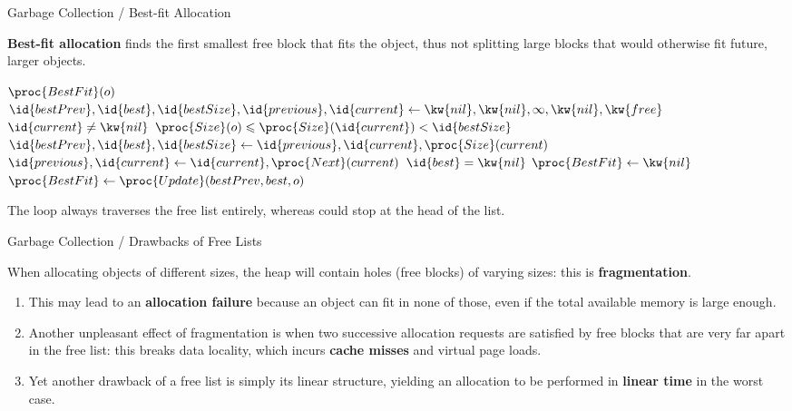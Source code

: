 \documentclass[compress,dvipdfmx]{beamer}
\begin{document}
%
\begin{frame}{Garbage Collection / Best-fit Allocation}

  \textbf{Best-fit allocation} finds the first smallest free block
  that fits the object, thus not splitting large blocks that would
  otherwise fit future, larger objects.
  \begin{codebox}
    \(\proc{BestFit}(o)\)\\
    \li \(\id{bestPrev}, \id{best}, \id{bestSize}, \id{previous}, \id{current}
          \gets \kw{nil}, \kw{nil}, \infty, \kw{nil}, \kw{free}\)
    \li \While \(\id{current} \neq \kw{nil}\) 
    \li \> \If \(\proc{Size}(o) \leqslant \proc{Size}(\id{current})
                < \id{bestSize}\)
    \li    \Then \(\id{bestPrev}, \id{best}, \id{bestSize} \gets
                   \id{previous}, \id{current}, \proc{Size}(current)\)
           \End
    \li \> \(\id{previous}, \id{current} \gets \id{current}, \proc{Next}(current)\)
    \li \If \(\id{best} = \kw{nil}\)
    \li \Then \(\proc{BestFit} \gets \kw{nil}\)
    \li \Else \(\proc{BestFit} \gets \proc{Update}(bestPrev, best, o)\)
        \End
  \end{codebox}
  The loop always traverses the free list entirely, whereas
   could stop at the head of the list.

\end{frame}

%
\begin{frame}{Garbage Collection / Drawbacks of Free Lists}

   When allocating objects of different sizes, the heap will contain
   holes (free blocks) of varying sizes: this is
   \textbf{fragmentation}.
   \begin{enumerate}

     \item This may lead to an \textbf{allocation failure} because an
       object can fit in none of those, even if the total available
       memory is large enough.

     \item Another unpleasant effect of fragmentation is when two
       successive allocation requests are satisfied by free blocks
       that are very far apart in the free list: this breaks data
       locality, which incurs \textbf{cache misses} and virtual page
       loads.

     \item Yet another drawback of a free list is simply its linear
       structure, yielding an allocation to be performed in
       \textbf{linear time} in the worst case.

   \end{enumerate}

\end{frame}
\end{document}
